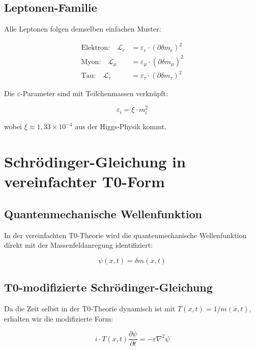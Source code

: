 \documentclass[12pt,a4paper]{article}
\newcommand{\deltam}{\delta m}
\newcommand{\Lag}{\mathcal{L}}
\newcommand{\xipar}{\xi}
\theoremstyle{definition}
\theoremstyle{remark}
\begin{document}
	\subsection{Leptonen-Familie}
	
	Alle Leptonen folgen demselben einfachen Muster:
	
	\begin{align}
		\text{Elektron:} \quad \Lag_e &= \varepsilon_e \cdot (\partial \deltam_e)^2 \\
		\text{Myon:} \quad \Lag_{\mu} &= \varepsilon_{\mu} \cdot (\partial \deltam_{\mu})^2 \\
		\text{Tau:} \quad \Lag_{\tau} &= \varepsilon_{\tau} \cdot (\partial \deltam_{\tau})^2
	\end{align}
	
	Die $\varepsilon$-Parameter sind mit Teilchenmassen verknüpft:
	
	\begin{equation}
		\varepsilon_i = \xipar \cdot m_i^2
		\label{eq:epsilon_mass_relation}
	\end{equation}
	
	wobei $\xipar \approx 1{,}33 \times 10^{-4}$ aus der Higgs-Physik kommt.
	

	\section{Schrödinger-Gleichung in vereinfachter T0-Form}
	
	\subsection{Quantenmechanische Wellenfunktion}
	
	In der vereinfachten T0-Theorie wird die quantenmechanische Wellenfunktion direkt mit der Massenfeldanregung identifiziert:
	
	\begin{equation}
		\boxed{\psi(x,t) = \deltam(x,t)}
		\label{eq:wavefunction_identification}
	\end{equation}
	
	\subsection{T0-modifizierte Schrödinger-Gleichung}
	
	Da die Zeit selbst in der T0-Theorie dynamisch ist mit $T(x,t) = 1/m(x,t)$, erhalten wir die modifizierte Form:
	
	\begin{equation}
		\boxed{i \cdot T(x,t) \frac{\partial\psi}{\partial t} = -\varepsilon \nabla^2 \psi}
		\label{eq:t0_modified_schrodinger}
	\end{equation}
	
\end{document}
